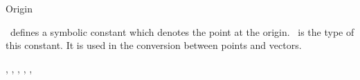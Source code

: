 \begin{ccRefClass}{Origin}

\ccDefinition
\cgal\ defines a symbolic constant
  which denotes the point at the origin.
\ccRefName\ is the type of this constant.
It is used in the conversion between points and vectors.

\ccSeeAlso
{}, ,
, ,
, 
\end{ccRefClass}

